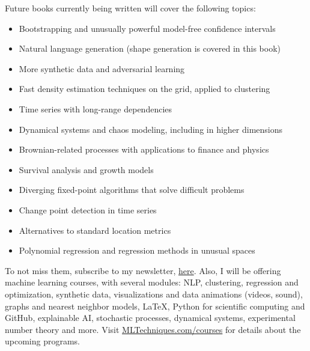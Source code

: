 \documentclass[oneside,10pt]{book}
\begin{document}
\noindent Future books currently being written will cover the following topics: \vspace{1ex}

\begin{itemize}
\item Bootstrapping and unusually powerful model-free confidence intervals
\item Natural language generation (shape generation is covered in this book)
\item More synthetic data and adversarial learning
\item Fast density estimation techniques on the grid, applied to clustering
\item Time series with long-range dependencies
\item Dynamical systems and chaos modeling, including in higher dimensions
\item Brownian-related processes with applications to finance and physics
\item Survival analysis and growth models
\item Diverging fixed-point algorithms that solve difficult problems
\item Change point detection in time series
\item Alternatives to standard location metrics
\item Polynomial regression and regression methods in unusual spaces
\end{itemize} \vspace{1ex}

\noindent To not miss them, subscribe to my newsletter, \href{https://mltechniques.com/resources/}{here}. Also, I will be offering machine learning courses, with several modules: NLP, clustering, regression and optimization, synthetic data,
 visualizations and data animations (videos, sound),  graphs and nearest neighbor models, LaTeX,
  Python for scientific computing and GitHub, explainable AI, stochastic processes, dynamical systems, experimental number theory and more. Visit
\href{https://mltechniques.com/courses/}{MLTechniques.com/courses} for details about the upcoming programs.




\setlength{\glsdescwidth}{0.75\hsize}
\pagebreak
\printnoidxglossary[type=gloss,style=long,title={Glossary},sort=def] %


\printindex

\hypersetup{linkcolor=red} %
\hypersetup{linkcolor=red}
\end{document}
